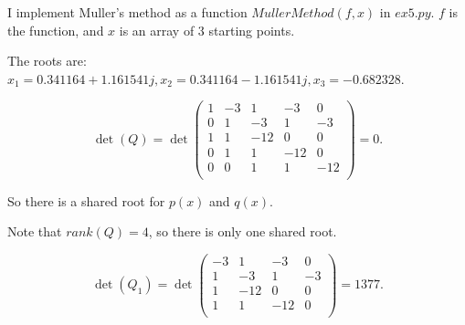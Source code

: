 \documentclass[
  course = {{16-811 Math Fundamentals for Robotics}},
  quartile = {{1}},
  assignment = 2,
  name = {{Kangle Deng}},
  email = {{kangled@andrew.cmu.edu}},
  firstexercise = 1
]{aga-homework}
\begin{document}


\exercise
\subexercise
I implement Muller's method as a function $MullerMethod(f, x)$ in $ex5.py$. $f$ is the function, and $x$ is an array of 3 starting points. 

\subexercise
The roots are: $x_1 = 0.341164+1.161541j, x_2 = 0.341164-1.161541j, x_3 = -0.682328$.

\exercise
\subexercise
\begin{equation*}
    \det(Q) = \det \left(
    \begin{array}{ccccc}
        1 & -3 & 1 & -3 & 0  \\
        0 & 1 & -3 & 1 & -3  \\
        1 & 1 & -12 & 0 & 0  \\
        0 & 1 & 1 & -12 & 0  \\
        0 & 0 & 1 & 1 & -12  \\
    \end{array}
    \right)
    = 0.
\end{equation*}

So there is a shared root for $p(x)$ and $q(x)$.

\subexercise
Note that $rank(Q) = 4$, so there is only one shared root.

\begin{equation*}
    \det(Q_1) = \det \left(
    \begin{array}{cccc}
        -3 & 1 & -3 & 0  \\
        1 & -3 & 1 & -3  \\
        1 & -12 & 0 & 0  \\
        1 & 1 & -12 & 0  \\
    \end{array}
    \right)
    = 1377.
\end{equation*}
\end{document}
